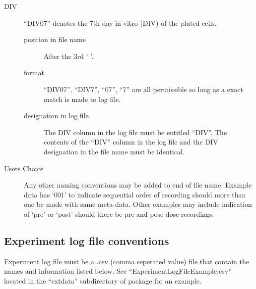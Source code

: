 \documentclass{article}\usepackage[]{graphicx}\usepackage[]{color}
\begin{document}
\begin{description}
\item[DIV] ``DIV07'' denotes the 7th day in vitro (DIV) of the plated cells.
\begin{description}
\item[position in file name] After the 3rd ` \textunderscore '.
\item[format]  ``DIV07'', ``DIV7'', ``07'', ``7'' are all permissible so long as a exact match is made to log file.
\item[designation in log file] The DIV column in the log file must be entitled ``DIV''. The contents of the ``DIV'' column in the log file and the DIV designation in the file name must be identical.
\end{description}

\item[Users Choice] Any other naming conventions may be added to end of file name. Example data has `001' to indicate sequential order of recording should more than one be made with same meta-data.  Other examples may include indication of `pre' or  `post'  should there be pre and pose dose recordings.

\end{description}




\subsection*{Experiment log file conventions}
Experiment log file must be a .csv (comma seperated value) file that contain the names and information listed below.  See  ``Experiment\textunderscore LogFileExample.csv'' located in the ``extdata'' subdirectory of package for an example.
\end{document}
